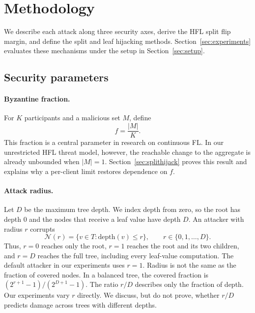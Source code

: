 \documentclass[11pt]{article}
\newcommand{\rev}[1]{{\color{blue}#1}}
\begin{document}
\section{Methodology}
\label{sec:methodology}

We describe each attack along three security axes, derive the HFL split flip margin, and define the split and leaf hijacking methods. Section~\ref{sec:experiments} evaluates these mechanisms under the setup in Section~\ref{sec:setup}.

\subsection{Security parameters}
\label{sec:parameters}

\paragraph{Byzantine fraction.}
For $K$ participants and a malicious set $M$, define
\begin{equation}
f = \frac{\lvert M\rvert}{K}.
\label{eq:fdef}
\end{equation}
This fraction is a central parameter in research on continuous FL. In our unrestricted HFL threat model, however, the reachable change to the aggregate is already unbounded when $\lvert M\rvert=1$. Section~\ref{sec:splithijack} proves this result and explains why a per-client limit restores dependence on $f$.

\paragraph{Attack radius.}
Let $D$ be the maximum tree depth. \rev{We index depth from zero, so the root has depth $0$ and the nodes that receive a leaf value have depth $D$.} An attacker with radius $r$ corrupts
\begin{equation}
\mathcal{N}(r)=\{v\in T:\mathrm{depth}(v)\leq r\},
\qquad r\in\{0,1,\ldots,D\}.
\label{eq:rdef}
\end{equation}
\rev{Thus, $r=0$ reaches only the root, $r=1$ reaches the root and its two children, and $r=D$ reaches the full tree, including every leaf-value computation. The default attacker in our experiments uses $r=1$.} Radius is not the same as the fraction of covered nodes. In a balanced tree, the covered fraction is \rev{$(2^{r+1}-1)/(2^{D+1}-1)$}. The ratio $r/D$ describes only the fraction of depth. Our experiments vary $r$ directly. We discuss, but do not prove, whether $r/D$ predicts damage across trees with different depths.
\end{document}
